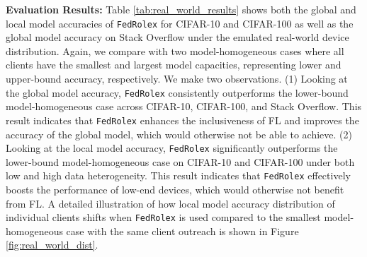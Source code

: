 \documentclass{article}
\begin{document}
\textbf{Evaluation Results:} 
Table \ref{tab:real_world_results} shows both the global and local model accuracies of \texttt{FedRolex} for CIFAR-10 and CIFAR-100 as well as the global model accuracy on Stack Overflow under the emulated real-world device distribution. Again, we compare with two model-homogeneous cases where all clients have the smallest and largest model capacities, representing lower and upper-bound accuracy, respectively.
%
%
We make two observations.
%
(1) Looking at the global model accuracy, \texttt{FedRolex} consistently outperforms the lower-bound model-homogeneous case across CIFAR-10, CIFAR-100, and Stack Overflow. This result indicates that \texttt{FedRolex} enhances the inclusiveness of FL and improves the accuracy of the global model, which would otherwise not be able to achieve.
%
(2) Looking at the local model accuracy,  \texttt{FedRolex} significantly outperforms the lower-bound model-homogeneous case on CIFAR-10 and CIFAR-100 under both low and high data heterogeneity. This result indicates that \texttt{FedRolex} effectively boosts the performance of low-end devices, which would otherwise not benefit from FL. A detailed illustration of how local model accuracy distribution of individual clients shifts when \texttt{FedRolex} is used compared to the smallest model-homogeneous case with the same client outreach is shown in Figure \ref{fig:real_world_dist}. 
\end{document}

